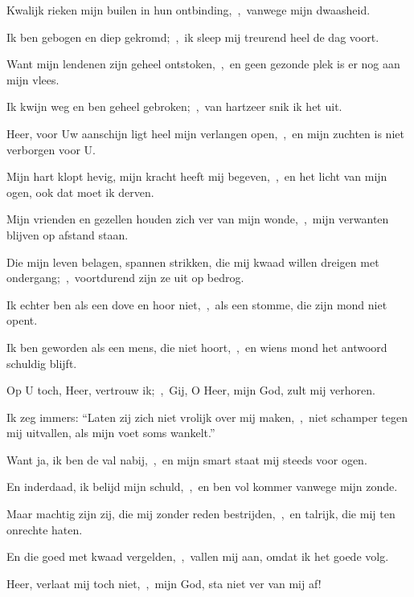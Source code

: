 \documentclass[12pt,twoside,a5paper]{article}
\begin{document}

\begin{halfparskip}
  Kwalijk rieken mijn builen in hun ontbinding,~\sep\ vanwege mijn dwaasheid.

  Ik ben gebogen en diep gekromd;~\sep\ ik sleep mij treurend heel de dag voort.

  Want mijn lendenen zijn geheel ontstoken,~\sep\ en geen gezonde plek is er nog aan mijn vlees.

  Ik kwijn weg en ben geheel gebroken;~\sep\ van hartzeer snik ik het uit.

  Heer, voor Uw aanschijn ligt heel mijn verlangen open,~\sep\ en mijn zuchten is niet verborgen voor U.

  Mijn hart klopt hevig, mijn kracht heeft mij begeven,~\sep\ en het licht van mijn ogen, ook dat moet ik derven.

  Mijn vrienden en gezellen houden zich ver van mijn wonde,~\sep\ mijn verwanten blijven op afstand staan.

  Die mijn leven belagen, spannen strikken, die mij kwaad willen dreigen met ondergang;~\sep\ voortdurend zijn ze uit op bedrog.
\end{halfparskip}


\begin{halfparskip}
  Ik echter ben als een dove en hoor niet,~\sep\ als een stomme, die zijn mond niet opent.

  Ik ben geworden als een mens, die niet hoort,~\sep\ en wiens mond het antwoord schuldig blijft.

  Op U toch, Heer, vertrouw ik;~\sep\ Gij, O Heer, mijn God, zult mij verhoren.

  Ik zeg immers: ``Laten zij zich niet vrolijk over mij maken,~\sep\ niet schamper tegen mij uitvallen, als mijn voet soms wankelt.''

  Want ja, ik ben de val nabij,~\sep\ en mijn smart staat mij steeds voor ogen.

  En inderdaad, ik belijd mijn schuld,~\sep\ en ben vol kommer vanwege mijn zonde.

  Maar machtig zijn zij, die mij zonder reden bestrijden,~\sep\ en talrijk, die mij ten onrechte haten.

  En die goed met kwaad vergelden,~\sep\ vallen mij aan, omdat ik het goede volg.

  Heer, verlaat mij toch niet,~\sep\ mijn God, sta niet ver van mij af!
\end{halfparskip}
\end{document}
